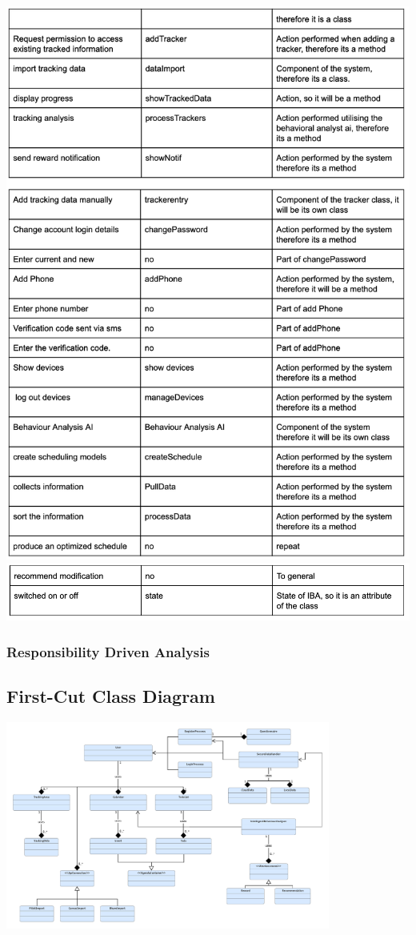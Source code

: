 \documentclass[a4paper,11pt]{article} %
\begin{document}
\begin{center}
    \includegraphics[scale=0.9]{img/noun-verb/page4.png}
    \includegraphics[scale=0.9]{img/noun-verb/page5.png}
\end{center}

\subsubsection*{Responsibility Driven Analysis}

\subsection{First-Cut Class Diagram}
\begin{center}
\includegraphics[angle=-90,width=0.8\textwidth]{img/Firstcut_Class_Diagram.pdf}
\end{center}
\end{document}
